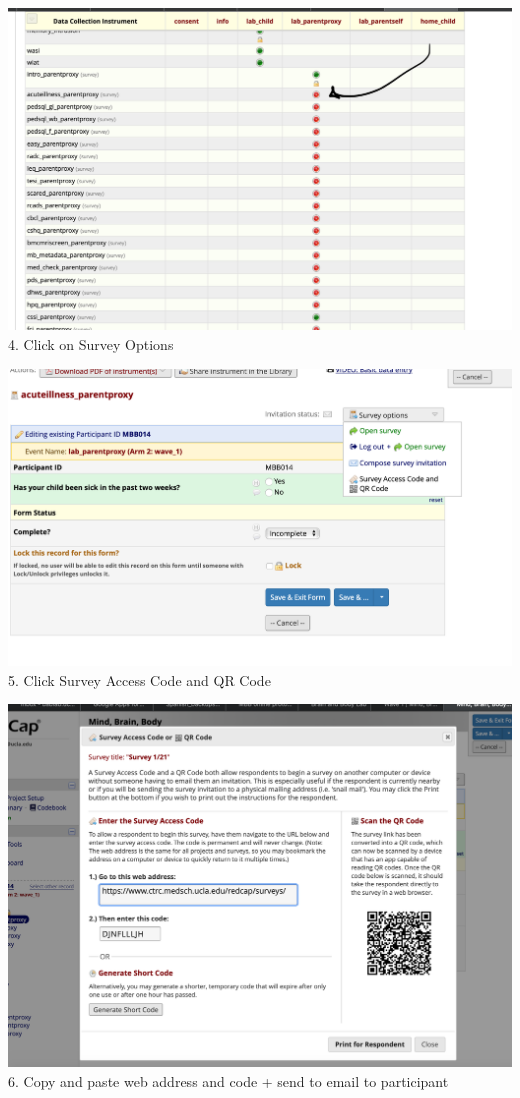 \documentclass[]{book}
\begin{document}
\includegraphics{images/redcap_code/3.png}
4. Click on Survey Options

\includegraphics{images/redcap_code/4.png}
5. Click Survey Access Code and QR Code

\includegraphics{images/redcap_code/5.png}
6. Copy and paste web address and code + send to email to participant
\end{document}
